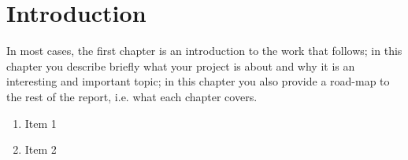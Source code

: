 \chapter{Introduction}
In most cases, the first chapter is an introduction to the work that follows; in this chapter you
describe briefly what your project is about and why it is an interesting and important topic; in this
chapter you also provide a road-map to the rest of the report, i.e. what each chapter covers.
\begin{enumerate}
  \item Item 1
  \item Item 2
\end{enumerate}
